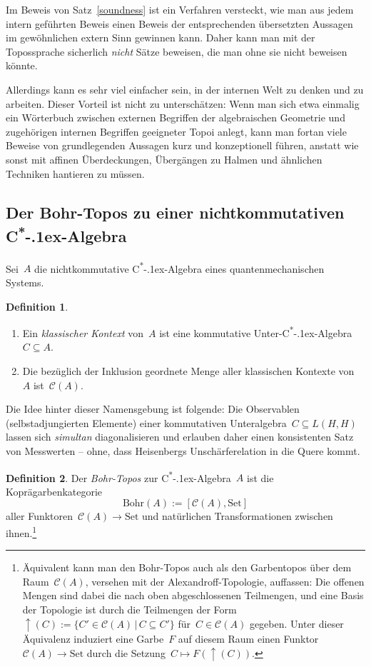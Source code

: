\documentclass[a4paper,ngerman,12pt]{scrartcl}
\theoremstyle{definition}
\newtheorem{defn}{Definition}[section]
\theoremstyle{plain}
\theoremstyle{remark}
\newcommand{\C}{\mathcal{C}}
\newcommand{\Bohr}{\mathrm{Bohr}}
\newcommand{\csalgebra}{C\textsuperscript{*}\kern-.1ex-Algebra}
\newcommand{\Set}{\mathrm{Set}}
\renewcommand{\_}{\mathpunct{.}\,}
\newcommand{\?}{\,{:}\,}
\begin{document}
Im Beweis von Satz~\ref{soundness} ist ein Verfahren versteckt, wie man aus
jedem intern geführten Beweis einen Beweis der entsprechenden übersetzten
Aussagen im gewöhnlichen extern Sinn gewinnen kann. Daher kann man mit der
Topossprache sicherlich \emph{nicht} Sätze beweisen, die man ohne sie nicht
beweisen könnte.

Allerdings kann es sehr viel einfacher sein, in der internen Welt zu denken und
zu arbeiten. Dieser Vorteil ist nicht zu unterschätzen: Wenn man sich etwa
einmalig ein Wörterbuch zwischen externen Begriffen der algebraischen Geometrie
und zugehörigen internen Begriffen geeigneter Topoi anlegt, kann man fortan
viele Beweise von grundlegenden Aussagen kurz und konzeptionell
führen, anstatt wie sonst mit affinen Überdeckungen, Übergängen zu Halmen
und ähnlichen Techniken hantieren zu müssen.


\subsection{Der Bohr-Topos zu einer nichtkommutativen \csalgebra}

Sei~$A$ die nichtkommutative \csalgebra{} eines quantenmechanischen Systems.

\begin{defn}\begin{enumerate}
\item
Ein \emph{klassischer Kontext} von~$A$ ist eine kommutative Unter-\csalgebra~$C
\subseteq A$.
\item Die bezüglich der Inklusion geordnete Menge aller klassischen Kontexte
von~$A$ ist~$\C(A)$.
\end{enumerate}
\end{defn}

Die Idee hinter dieser Namensgebung ist folgende: Die Observablen
(selbstadjungierten Elemente) einer kommutativen Unteralgebra~$C \subseteq
L(H,H)$ lassen sich \emph{simultan} diagonalisieren und erlauben daher einen
konsistenten Satz von Messwerten -- ohne, dass Heisenbergs Unschärferelation in
die Quere kommt.

\begin{defn}Der \emph{Bohr-Topos} zur \csalgebra~$A$ ist die Koprägarbenkategorie
\[ \Bohr(A) := [\C(A), \Set] \]
aller Funktoren~$\C(A) \to \Set$ und natürlichen Transformationen zwischen
ihnen.\footnote{Äquivalent kann man den Bohr-Topos auch als den Garbentopos
über dem Raum~$\C(A)$, versehen mit der Alexandroff-Topologie, auffassen: Die offenen Mengen
sind dabei die nach oben abgeschlossenen Teilmengen, und eine Basis der
Topologie ist durch die Teilmengen der Form~${\uparrow}(C) := \{ C' \in \C(A)
\,|\, C \subseteq C' \}$ für~$C \in \C(A)$ gegeben. Unter dieser Äquivalenz
induziert eine Garbe~$F$ auf diesem
Raum einen Funktor~$\C(A) \to \Set$ durch die Setzung~$C \mapsto
F({\uparrow}(C))$.}
\end{defn}
\end{document}
